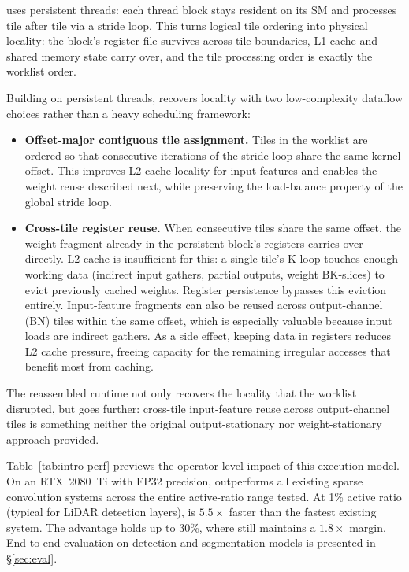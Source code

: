 \sysname uses persistent threads: each thread block stays resident on its
SM and processes tile after tile via a stride loop.
This turns logical tile ordering into physical locality: the block's
register file survives across tile boundaries, L1 cache and shared memory
state carry over, and the tile processing order is exactly the worklist
order.

Building on persistent threads, \sysname recovers locality with two
low-complexity dataflow choices rather than a heavy scheduling framework:
%
\begin{itemize}
  \item \textbf{Offset-major contiguous tile assignment.}
        Tiles in the worklist are ordered so that consecutive iterations of
        the stride loop share the same kernel offset.
        This improves L2 cache locality for input features and enables the
        weight reuse described next, while preserving the load-balance
        property of the global stride loop.
  \item \textbf{Cross-tile register reuse.}
        When consecutive tiles share the same offset, the weight fragment
        already in the persistent block's registers carries over directly.
        L2 cache is insufficient for this: a single tile's K-loop touches
        enough working data (indirect input gathers, partial outputs,
        weight BK-slices) to evict previously cached weights.
        Register persistence bypasses this eviction entirely.
        Input-feature fragments can also be reused across output-channel
        (BN) tiles within the same offset, which is especially valuable
        because input loads are indirect gathers.
        As a side effect, keeping data in registers reduces L2 cache
        pressure, freeing capacity for the remaining irregular accesses
        that benefit most from caching.
\end{itemize}
%
The reassembled runtime not only recovers the locality that the worklist
disrupted, but goes further: cross-tile input-feature reuse across
output-channel tiles is something neither the original output-stationary
nor weight-stationary approach provided.

Table~\ref{tab:intro-perf} previews the operator-level impact of this
execution model.
On an RTX~2080~Ti with FP32 precision, \sysname outperforms all existing
sparse convolution systems across the entire active-ratio range tested.
At 1\% active ratio (typical for LiDAR detection layers), \sysname is
$5.5\times$ faster than the fastest existing system.
The advantage holds up to 30\%, where \sysname still maintains a
$1.8\times$ margin.
End-to-end evaluation on detection and segmentation models is presented
in \S\ref{sec:eval}.

